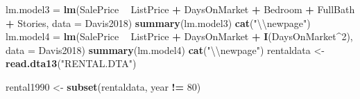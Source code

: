 \documentclass[
]{article}
\newenvironment{Shaded}{\begin{snugshade}}{\end{snugshade}}
\newcommand{\CharTok}[1]{\textcolor[rgb]{0.31,0.60,0.02}{#1}}
\newcommand{\DataTypeTok}[1]{\textcolor[rgb]{0.13,0.29,0.53}{#1}}
\newcommand{\DecValTok}[1]{\textcolor[rgb]{0.00,0.00,0.81}{#1}}
\newcommand{\KeywordTok}[1]{\textcolor[rgb]{0.13,0.29,0.53}{\textbf{#1}}}
\newcommand{\NormalTok}[1]{#1}
\newcommand{\OperatorTok}[1]{\textcolor[rgb]{0.81,0.36,0.00}{\textbf{#1}}}
\newcommand{\StringTok}[1]{\textcolor[rgb]{0.31,0.60,0.02}{#1}}
\begin{document}
\begin{Shaded}
\begin{Highlighting}[]
{{{{{{{{{\NormalTok{lm.model3 =}\StringTok{ }\KeywordTok{lm}\NormalTok{(SalePrice }\OperatorTok{~}\StringTok{ }\NormalTok{ListPrice }\OperatorTok{+}\StringTok{ }\NormalTok{DaysOnMarket }\OperatorTok{+}\StringTok{ }\NormalTok{Bedroom }\OperatorTok{+}\StringTok{ }\NormalTok{FullBath }\OperatorTok{+}\StringTok{ }\NormalTok{Stories, }\DataTypeTok{data =}\NormalTok{ Davis2018)}
\KeywordTok{summary}\NormalTok{(lm.model3)}
\KeywordTok{cat}\NormalTok{(}\StringTok{"}\CharTok{\textbackslash{}\textbackslash{}}\StringTok{newpage"}\NormalTok{)}
\NormalTok{lm.model4 =}\StringTok{ }\KeywordTok{lm}\NormalTok{(SalePrice }\OperatorTok{~}\StringTok{ }\NormalTok{ListPrice }\OperatorTok{+}\StringTok{ }\NormalTok{DaysOnMarket }\OperatorTok{+}\StringTok{ }\KeywordTok{I}\NormalTok{(DaysOnMarket}\OperatorTok{^}\DecValTok{2}\NormalTok{), }\DataTypeTok{data =}\NormalTok{ Davis2018)}
\KeywordTok{summary}\NormalTok{(lm.model4)}
\KeywordTok{cat}\NormalTok{(}\StringTok{"}\CharTok{\textbackslash{}\textbackslash{}}\StringTok{newpage"}\NormalTok{)}
\NormalTok{rentaldata <-}\StringTok{ }\KeywordTok{read.dta13}\NormalTok{(}\StringTok{"RENTAL.DTA"}\NormalTok{)}

\NormalTok{rental1990 <-}\StringTok{ }\KeywordTok{subset}\NormalTok{(rentaldata, year }\OperatorTok{!=}\StringTok{ }\DecValTok{80}\NormalTok{)}

}}}}}}}}}
\end{Highlighting}
\end{Shaded}
\end{document}
